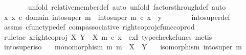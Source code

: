 \begin{isabellebody}
\ \ \ \ \ \ \isamarkupfalse%
\ {\isacharparenleft}{\kern0pt}unfold\ relative{\isacharunderscore}{\kern0pt}member{\isacharunderscore}{\kern0pt}def{}{\isacharcomma}{\kern0pt}\ auto{\isacharcomma}{\kern0pt}\ unfold\ factors{\isacharunderscore}{\kern0pt}through{\isacharunderscore}{\kern0pt}def{}{\isacharcomma}{\kern0pt}\ auto{\isacharparenright}{\kern0pt}\isanewline
\ \ \ \ \isamarkupfalse%
\ \isamarkupfalse%
\ {\isachardoublequoteopen}{\isasymexists}x{\isachardot}{\kern0pt}\ x\ {\isasymin}\isactrlsub c\ domain\ {\isacharparenleft}{\kern0pt}into{\isacharunderscore}{\kern0pt}super\ m{\isacharparenright}{\kern0pt}\ {\isasymand}\ into{\isacharunderscore}{\kern0pt}super\ m\ {\isasymcirc}\isactrlsub c\ x\ {\isacharequal}{\kern0pt}\ y{\isachardoublequoteclose}\isanewline
\ \ \ \ \ \ \isamarkupfalse%
\ into{\isacharunderscore}{\kern0pt}super{\isacharunderscore}{\kern0pt}def\ \isamarkupfalse%
\ assms\ cfunc{\isacharunderscore}{\kern0pt}type{\isacharunderscore}{\kern0pt}def\ comp{\isacharunderscore}{\kern0pt}associative\ right{\isacharunderscore}{\kern0pt}coproj{\isacharunderscore}{\kern0pt}cfunc{\isacharunderscore}{\kern0pt}coprod\isanewline
\ \ \ \ \ \ \isamarkupfalse%
\ {\isacharparenleft}{\kern0pt}rule{\isacharunderscore}{\kern0pt}tac\ x{\isacharequal}{\kern0pt}{\isachardoublequoteopen}right{\isacharunderscore}{\kern0pt}coproj\ X\ {\isacharparenleft}{\kern0pt}Y\ {\isasymsetminus}\ {\isacharparenleft}{\kern0pt}X{\isacharcomma}{\kern0pt}\ m{\isacharparenright}{\kern0pt}{\isacharparenright}{\kern0pt}\ {\isasymcirc}\isactrlsub c\ x{\isacharprime}{\kern0pt}{\isachardoublequoteclose}\ \ exI{\isacharcomma}{\kern0pt}\ typecheck{\isacharunderscore}{\kern0pt}cfuncs{\isacharcomma}{\kern0pt}\ metis{\isacharparenright}{\kern0pt}\isanewline
\ \ \isamarkupfalse%
\isanewline
{}\isamarkupfalse%
%
\endisatagproof
{\isafoldproof}%
%
\isadelimproof
\isanewline
%
\endisadelimproof
\isanewline
{}\isamarkupfalse%
\ into{\isacharunderscore}{\kern0pt}super{\isacharunderscore}{\kern0pt}iso{\isacharcolon}{\kern0pt}\isanewline
\ \ \ {\isachardoublequoteopen}monomorphism\ m{\isachardoublequoteclose}\ {\isachardoublequoteopen}m\ {\isacharcolon}{\kern0pt}\ X\ {\isasymrightarrow}\ Y{\isachardoublequoteclose}\isanewline
\ \ \ {\isachardoublequoteopen}isomorphism\ {\isacharparenleft}{\kern0pt}into{\isacharunderscore}{\kern0pt}super\ m{\isacharparenright}{\kern0pt}{\isachardoublequoteclose}\isanewline

\end{isabellebody}
